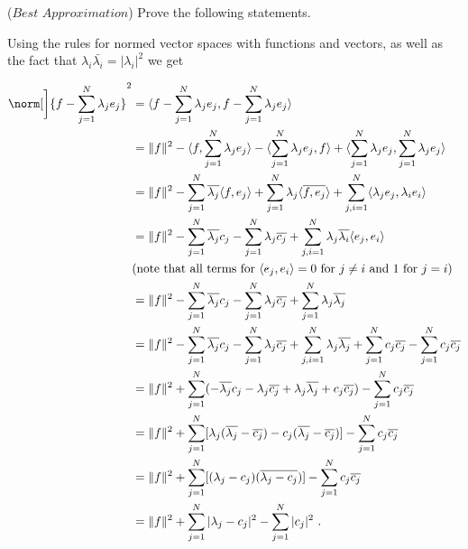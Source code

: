 ($\textit{Best Approximation}$) Prove the following statements.
\begin{questions}


\begin{solution}

Using the rules for normed vector spaces with functions and vectors, as well as the fact that $\lambda_i \bar{\lambda_i} = |\lambda_i|^2$ we get

\begin{align*}
\norm[\bigg]{ f - \sum_{j=1}^{N} \lambda_je_j }^2 &= \langle f - \sum_{j=1}^{N} \lambda_je_j, f - \sum_{j=1}^{N} \lambda_je_j \rangle \\
& = \|f\|^2 - \langle f, \sum_{j=1}^{N} \lambda_je_j  \rangle - \langle \sum_{j=1}^{N} \lambda_je_j , f \rangle + \langle \sum_{j=1}^{N} \lambda_je_j , \sum_{j=1}^{N} \lambda_je_j  \rangle \\
& = \|f\|^2 - \sum_{j=1}^{N} \overline{ \lambda_j} \langle f, e_j \rangle + \sum_{j=1}^{N} \lambda_j \langle \overline{ f,e_j} \rangle + \sum_{j,i=1}^{N} \langle \lambda_je_j,\lambda_ie_i \rangle \\
& = \|f\|^2 - \sum_{j=1}^{N} \overline{ \lambda_j} c_j - \sum_{j=1}^{N} \lambda_j \overline{c_j} + \sum_{j,i=1}^{N} \lambda_j \overline{ \lambda_i} \langle e_j,e_i \rangle \\
& (\text{note that all terms for}~ \langle e_j,e_i \rangle = 0~ \text{for}~ j \neq i~ \text{and}~1 ~\text{for}~j=i) \\
& = \|f\|^2 - \sum_{j=1}^{N} \overline{ \lambda_j} c_j - \sum_{j=1}^{N} \lambda_j \overline{c_j} + \sum_{j=1}^{N} \lambda_j \overline{ \lambda_j} \\
& = \|f\|^2 - \sum_{j=1}^{N} \overline{ \lambda_j} c_j - \sum_{j=1}^{N} \lambda_j \overline{c_j} + \sum_{j,i=1}^{N} \lambda_j \overline{ \lambda_j}  + \sum_{j=1}^{N} c_j \overline{c_j} - \sum_{j=1}^{N} c_j \overline{c_j} \\
& = \|f\|^2 + \sum_{j=1}^{N} (-\overline{ \lambda_j} c_j - \lambda_j \overline{c_j} +  \lambda_j \overline{ \lambda_j} + c_j \overline{c_j}) - \sum_{j=1}^{N} c_j \overline{c_j} \\
& = \|f\|^2 + \sum_{j=1}^{N} [ \lambda_j (\overline{\lambda_j}-\overline{c_j}) - c_j(\overline{\lambda_j}-\overline{c_j})] - \sum_{j=1}^{N} c_j \overline{c_j} \\
& = \|f\|^2 + \sum_{j=1}^{N} [ (\lambda_j-c_j) (\overline{\lambda_j-c_j })] - \sum_{j=1}^{N} c_j \overline{c_j} \\
& = \|f\|^2 + \sum_{j=1}^{N} |\lambda_j-c_j |^2 - \sum_{j=1}^{N} |c_j|^2~.
\end{align*}


\end{solution}
\end{questions}

